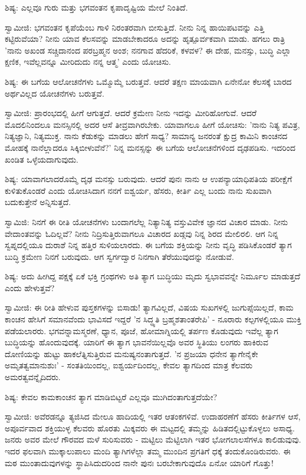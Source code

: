 ಶಿಷ್ಯ: ಎಲ್ಲವೂ ಗುರು ಮತ್ತು ಭಗವಂತನ ಕೃಪಾದೃಷ್ಟಿಯ ಮೇಲೆ ನಿಂತಿದೆ.

ಸ್ವಾಮೀಜಿ: ಭಗವಂತನ ಕೃಪೆಯೆಂಬ ಗಾಳಿ ನಿರಂತರವಾಗಿ ಬೀಸುತ್ತಿದೆ. ನೀನು ನಿನ್ನ ಹಾಯಿಪಟವನ್ನು ಎತ್ತಿ ಕಟ್ಟಿರುವೆಯಾ? ನೀನು ಯಾವ ಕೆಲಸವನ್ನು ಮಾಡಬೇಕಾದರೂ ಅದನ್ನು ಹೃತ್ಪೂರ್ವಕವಾಗಿ ಮಾಡು. ಹಗಲು ರಾತ್ರಿ 'ನಾನು ಅಖಂಡ ಸಚ್ಚಿದಾನಂದ ಪರಬ್ರಹ್ಮನ ಅಂಶ; ನನಗಾವ ಹೆದರಿಕೆ, ಕಳವಳ? ಈ ದೇಹ, ಮನಸ್ಸು, ಬುದ್ಧಿ ಎಲ್ಲಾ ಕ್ಷಣಿಕ, ಇವೆಲ್ಲವನ್ನೂ ಮೀರಿದುದು ನನ್ನ ಆತ್ಮ' ಎಂದು ಯೋಚಿಸು.

ಶಿಷ್ಯ: ಈ ಬಗೆಯ ಆಲೋಚನೆಗಳು ಒಮ್ಮೊಮ್ಮೆ ಬರುತ್ತವೆ. ಆದರೆ ತಕ್ಷಣ ಮಾಯವಾಗಿ ಏನೇನೋ ಕೆಲಸಕ್ಕೆ ಬಾರದ ಅರ್ಥವಿಲ್ಲದ ಯೋಚನೆಗಳು ಬರುತ್ತವೆ.

ಸ್ವಾಮೀಜಿ: ಪ್ರಾರಂಭದಲ್ಲಿ ಹೀಗೆ ಆಗುತ್ತದೆ. ಆದರೆ ಕ್ರಮೇಣ ನೀನು ಇದನ್ನು ಮೀರಿಹೋಗುವೆ. ಆದರೆ ಮೊದಲಿನಿಂದಲೂ ಮನಸ್ಸಿನಲ್ಲಿ ಅದರ ಆಸೆ ತೀವ್ರವಾಗಿರಬೇಕು. ಯಾವಾಗಲೂ ಹೀಗೆ ಯೋಚಿಸು: 'ನಾನು ನಿತ್ಯ ಪವಿತ್ರ, ನಿತ್ಯಜ್ಞಾನಿ, ನಿತ್ಯಮುಕ್ತ. ನಾನು ಕೆಡುಕನ್ನು ಮಾಡಲು ಹೇಗೆ ಸಾಧ್ಯ? ಸಾಮಾನ್ಯ ಜನರಂತೆ ಕ್ಷುದ್ರ ಕಾಮಿನಿ ಕಾಂಚನದ ಮೋಹಕ್ಕೆ ನಾನೆಲ್ಲಾದರೂ ಸಿಕ್ಕಿಬೀಳುವೆನೆ?' ನಿನ್ನ ಮನಸ್ಸನ್ನು ಈ ಬಗೆಯ ಆಲೋಚನೆಗಳಿಂದ ದೃಢಪಡಿಸು. ಇದರಿಂದ ಖಂಡಿತ ಒಳ್ಳೆಯದಾಗುವುದು.

ಶಿಷ್ಯ: ಯಾವಾಗಲಾದರೊಮ್ಮೆ ದೃಢ ಮನಸ್ಸು ಬರುವುದು. ಆದರೆ ಪುನಃ ನಾನು ಆ ಉಪನ್ಯಾಯಾಧಿಪತಿಯ ಪರೀಕ್ಷೆಗೆ ಕುಳಿತುಕೊಂಡರೆ ಎಂದು ಯೋಚಿಸಿದಾಗ ನನಗೆ ಐಶ್ವರ್ಯ, ಹೆಸರು, ಕೀರ್ತಿ ಎಲ್ಲ ಬಂದು ನಾನು ಸುಖವಾಗಿ ಬದುಕುತ್ತೇನೆ ಅನ್ನಿಸುತ್ತದೆ.

ಸ್ವಾಮಿಜಿ: ನಿನಗೆ ಈ ರೀತಿ ಯೋಚನೆಗಳು ಬಂದಾಗಲೆಲ್ಲ ನಿತ್ಯಾನಿತ್ಯ ವಸ್ತುವಿವೇಕ ಜ್ಞಾನದ ವಿಚಾರ ಮಾಡು. ನೀನು ವೇದಾಂತವನ್ನು ಓದಿಲ್ಲವೆ? ನೀನು ನಿದ್ರಿಸುತ್ತಿರುವಾಗಲೂ ವಿಚಾರದ ಖಡ್ಗವು ನಿನ್ನ ಶಿರದ ಮೇಲಿರಲಿ. ಆಗ ನಿನ್ನ ಸ್ವಪ್ನದಲ್ಲಿಯೂ ದುರಾಶೆ ನಿನ್ನ ಹತ್ತಿರ ಸುಳಿಯಲಾರದು. ಈ ಬಗೆಯ ಶಕ್ತಿಯನ್ನು ನೀನು ವೃದ್ಧಿ ಪಡಿಸಿಕೊಂಡರೆ ತ್ಯಾಗ ಬುದ್ಧಿ ಕ್ರಮೇಣ ನಿನಗೆ ಬರುವುದು. ಆಗ ಸ್ವರ್ಗದ್ವಾರ ನಿನಗಾಗಿ ತೆರೆಯುವುದನ್ನು ನೋಡುವೆ.

ಶಿಷ್ಯ: ಅದು ಹೀಗಿದ್ದ ಪಕ್ಷಕ್ಕೆ ಏಕೆ ಭಕ್ತಿ ಗ್ರಂಥಗಳು ಅತಿ ತ್ಯಾಗ ಬುದ್ಧಿಯು ಮೃದು ಸ್ವಭಾವವನ್ನೇ ನಿರ್ಮೂಲ ಮಾಡುತ್ತದೆ ಎಂದು ಹೇಳುತ್ತವೆ?

ಸ್ವಾಮೀಜಿ: ಈ ರೀತಿ ಹೇಳುವ ಪುಸ್ತಕಗಳನ್ನು ಬಿಸಾಡು! ತ್ಯಾಗವಿಲ್ಲದೆ, ವಿಷಯ ಸುಖಗಳಲ್ಲಿ ಜುಗುಪ್ಸೆಯಿಲ್ಲದೆ, ಕಾಮ ಕಾಂಚನ ಹೇಸಿಗೆ ಸಮಾನವೆಂದು ಭಾವಿಸದೆ ಇದ್ದರೆ 'ನ ಸಿದ್ಧ್ಯತಿ ಬ್ರಹ್ಮಶತಾಂತರೇಪಿ' - ನೂರಾರು ಕಲ್ಪಗಳಲ್ಲಿಯೂ ಮುಕ್ತಿ ಪಡೆಯಲಾರರು. ಭಗವನ್ನಾಮಸ್ಮರಣೆ, ಧ್ಯಾನ, ಪೂಜೆ, ಹೋಮಾಗ್ನಿಯಲ್ಲಿ ತರ್ಪಣ ಕೊಡುವುದು ಇವೆಲ್ಲ ತ್ಯಾಗ ಬುದ್ಧಿಯನ್ನು ಹೊಂದುವುದಕ್ಕೆ. ಯಾರಿಗೆ ಈ ತ್ಯಾಗ ಭಾವನೆಯಿಲ್ಲವೊ ಅವರ ಸ್ಥಿತಿಯು ಲಂಗರು ಹಾಕಿರುವ ದೋಣಿಯನ್ನು ಹುಟ್ಟು ಹಾಕಲೆತ್ನಿಸುತ್ತಿರುವ ಮನುಷ್ಯನಂತಾಗುತ್ತದೆ. 'ನ ಪ್ರಜಯಾ ಧನೇನ ತ್ಯಾಗೇನೈಕೇ ಅಮೃತತ್ವಮಾನುಶುಃ' - ಸಂತತಿಯಿಂದಲ್ಲ, ಐಶ್ವರ್ಯದಿಂದಲ್ಲ, ಕೇವಲ ತ್ಯಾಗದಿಂದ ಮಾತ್ರ ಕೆಲವರು ಅಮರತ್ವವನ್ನೈದಿದರು.

ಶಿಷ್ಯ: ಕೇವಲ ಕಾಮಕಾಂಚನ ತ್ಯಾಗ ಮಾಡಿಬಿಟ್ಟರೆ ಎಲ್ಲವೂ ಮುಗಿದಂತಾಗುತ್ತದೆಯೇ?

ಸ್ವಾಮೀಜಿ: ಅವೆರಡನ್ನೂ ತ್ಯಜಿಸಿದ ಮೇಲೂ ಹಾದಿಯಲ್ಲಿ ಇತರ ಆತಂಕಗಳಿವೆ. ಉದಾಹರಣೆಗೆ ಹೆಸರು ಕೀರ್ತಿಗಳ ಆಸೆ, ಅಪೂರ್ವವಾದ ಶಕ್ತಿಯುಳ್ಳ ಕೆಲವರು ಹೊರತು ಮಿಕ್ಕವರು ಈ ಮಟ್ಟದಲ್ಲಿ ತಮ್ಮನ್ನು ಹಿಡಿತದಲ್ಲಿಟ್ಟುಕೊಳ್ಳಲು ಅಸಾಧ್ಯ. ಜನರು ಅವರ ಮೇಲೆ ಗೌರವದ ಮಳೆ ಸುರಿಸುವರು - ಮಟ್ಟಿಲು ಮೆಟ್ಟಿಲಾಗಿ ಇತರ ಭೋಗಲಾಲಸೆಗಳೂ ಕಾಲಿಡುವುವು. ಇದರ ಫಲವಾಗಿ ಮುಕ್ಕಾಲುಪಾಲು ಮಂದಿ ತ್ಯಾಗಿಗಳೆಲ್ಲಾ ತಮ್ಮ ಮುಂದಿನ ಪ್ರಗತಿಗೆ ಧಕ್ಕೆ ತಂದುಕೊಂಡಿರುವರು. ಈ ಮಠ ಮುಂತಾದುವುಗಳನ್ನು ಸ್ಥಾಪಿಸಿದುದರಿಂದ ನಾನೇ ಪುನಃ ಬರಬೇಕಾಗುವುದೊ ಏನೋ ಯಾರಿಗೆ ಗೊತ್ತು!

